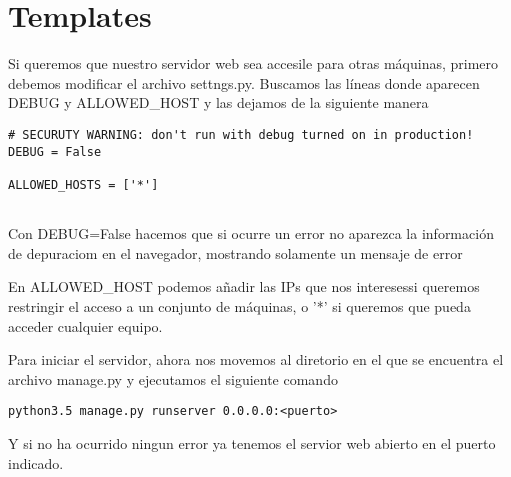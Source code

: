 \section{Templates}

Si queremos que nuestro servidor web sea accesile para otras máquinas, primero debemos
modificar el archivo settngs.py. Buscamos las líneas donde aparecen DEBUG y ALLOWED\_HOST y 
las dejamos de la siguiente manera


\lstset{
  language=Python,
}
\begin{lstlisting}
# SECURUTY WARNING: don't run with debug turned on in production!
DEBUG = False

ALLOWED_HOSTS = ['*']


\end{lstlisting}

Con DEBUG=False hacemos que si ocurre un error no aparezca la información de depuraciom en el 
navegador, mostrando solamente un mensaje de error

En ALLOWED\_HOST podemos añadir las IPs que nos interesessi queremos restringir el acceso a un
conjunto de máquinas, o '*' si queremos que pueda acceder cualquier equipo.

Para iniciar el servidor, ahora nos movemos al diretorio en el que se encuentra el archivo manage.py y ejecutamos el siguiente comando

\lstset{
  language=Bash,
}
\begin{lstlisting}
python3.5 manage.py runserver 0.0.0.0:<puerto>
\end{lstlisting}

Y si no ha ocurrido ningun error ya tenemos el servior web abierto en el puerto indicado.

